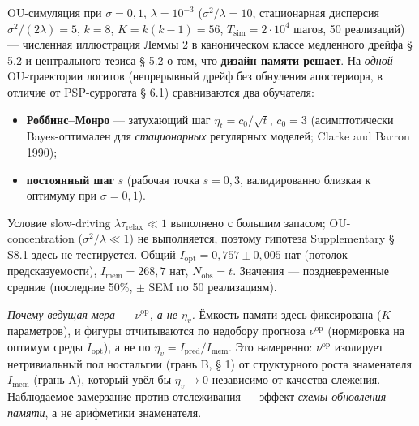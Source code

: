 \documentclass[pdflatex,sn-mathphys-ay]{sn-jnl}
\providecommand{\tightlist}{\setlength{\itemsep}{0pt}\setlength{\parskip}{0pt}}
\begin{document}
OU-симуляция при \(\sigma = 0{,}1\), \(\lambda = 10^{-3}\) (\(\sigma^2/\lambda = 10\), стационарная дисперсия \(\sigma^2/(2\lambda) = 5\), \(k = 8\), \(K = k(k-1) = 56\), \(T_{\text{sim}} = 2 \cdot 10^4\) шагов, 50 реализаций) --- численная иллюстрация Леммы 2 в каноническом классе медленного дрейфа § 5.2 и центрального тезиса § 5.2 о том, что \textbf{дизайн памяти решает}. На \emph{одной} OU-траектории логитов (непрерывный дрейф без обнуления апостериора, в отличие от PSP-суррогата § 6.1) сравниваются два обучателя:



\begin{itemize}

\tightlist

\item

  \textbf{Роббинс--Монро} --- затухающий шаг \(\eta_t = c_0/\sqrt t\), \(c_0 = 3\) (асимптотически Bayes-оптимален для \emph{стационарных} регулярных моделей; Clarke and Barron 1990);

\item

  \textbf{постоянный шаг} \(s\) (рабочая точка \(s = 0{,}3\), валидированно близкая к оптимуму при \(\sigma = 0{,}1\)).

\end{itemize}



Условие slow-driving \(\lambda \tau_{\text{relax}} \ll 1\) выполнено с большим запасом; OU-concentration (\(\sigma^2/\lambda \ll 1\)) не выполняется, поэтому гипотеза Supplementary § S8.1 здесь не тестируется. Общий \(I_{\text{opt}} = 0{,}757 \pm 0{,}005\) нат (потолок предсказуемости), \(I_{\text{mem}} = 268{,}7\) нат, \(N_{\text{obs}} = t\). Значения --- поздневременные средние (последние 50\%, \(\pm\) SEM по 50 реализациям).



\emph{Почему ведущая мера --- \(\nu^{\text{op}}\), а не \(\eta_v\).} Ёмкость памяти здесь фиксирована (\(K\) параметров), и фигуры отчитываются по недобору прогноза \(\nu^{\text{op}}\) (нормировка на оптимум среды \(I_{\text{opt}}\)), а не по \(\eta_v = I_{\text{pred}}/I_{\text{mem}}\). Это намеренно: \(\nu^{\text{op}}\) изолирует нетривиальный пол ностальгии (грань B, § 1) от структурного роста знаменателя \(I_{\text{mem}}\) (грань A), который увёл бы \(\eta_v \to 0\) независимо от качества слежения. Наблюдаемое замерзание против отслеживания --- эффект \emph{схемы обновления памяти}, а не арифметики знаменателя.
\end{document}
